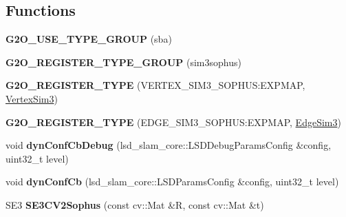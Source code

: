\subsection*{Functions}
\begin{DoxyCompactItemize}
\item 
\hypertarget{namespacelsd__slam_a3ba3963b636881bd28720c52808d52ce}{{\bfseries G2\-O\-\_\-\-U\-S\-E\-\_\-\-T\-Y\-P\-E\-\_\-\-G\-R\-O\-U\-P} (sba)}\label{namespacelsd__slam_a3ba3963b636881bd28720c52808d52ce}

\item 
\hypertarget{namespacelsd__slam_abd9538eb7de29ff8295b227fd54e4e87}{{\bfseries G2\-O\-\_\-\-R\-E\-G\-I\-S\-T\-E\-R\-\_\-\-T\-Y\-P\-E\-\_\-\-G\-R\-O\-U\-P} (sim3sophus)}\label{namespacelsd__slam_abd9538eb7de29ff8295b227fd54e4e87}

\item 
\hypertarget{namespacelsd__slam_a205cc9180f3d2b9b45b882dddcd40631}{{\bfseries G2\-O\-\_\-\-R\-E\-G\-I\-S\-T\-E\-R\-\_\-\-T\-Y\-P\-E} (V\-E\-R\-T\-E\-X\-\_\-\-S\-I\-M3\-\_\-\-S\-O\-P\-H\-U\-S\-:\-E\-X\-P\-M\-A\-P, \hyperlink{classlsd__slam_1_1_vertex_sim3}{Vertex\-Sim3})}\label{namespacelsd__slam_a205cc9180f3d2b9b45b882dddcd40631}

\item 
\hypertarget{namespacelsd__slam_a06e80794e500dc135bd4cba50e80565e}{{\bfseries G2\-O\-\_\-\-R\-E\-G\-I\-S\-T\-E\-R\-\_\-\-T\-Y\-P\-E} (E\-D\-G\-E\-\_\-\-S\-I\-M3\-\_\-\-S\-O\-P\-H\-U\-S\-:\-E\-X\-P\-M\-A\-P, \hyperlink{classlsd__slam_1_1_edge_sim3}{Edge\-Sim3})}\label{namespacelsd__slam_a06e80794e500dc135bd4cba50e80565e}

\item 
\hypertarget{namespacelsd__slam_a1727ed6a6a3b9b25505843d48cee74b5}{void {\bfseries dyn\-Conf\-Cb\-Debug} (lsd\-\_\-slam\-\_\-core\-::\-L\-S\-D\-Debug\-Params\-Config \&config, uint32\-\_\-t level)}\label{namespacelsd__slam_a1727ed6a6a3b9b25505843d48cee74b5}

\item 
\hypertarget{namespacelsd__slam_a0c6488bcb7e77ab97cae5c9db84ef819}{void {\bfseries dyn\-Conf\-Cb} (lsd\-\_\-slam\-\_\-core\-::\-L\-S\-D\-Params\-Config \&config, uint32\-\_\-t level)}\label{namespacelsd__slam_a0c6488bcb7e77ab97cae5c9db84ef819}

\item 
\hypertarget{namespacelsd__slam_a2b1864fb1c4a322800ac8449bafd4d32}{S\-E3 {\bfseries S\-E3\-C\-V2\-Sophus} (const cv\-::\-Mat \&R, const cv\-::\-Mat \&t)}\label{namespacelsd__slam_a2b1864fb1c4a322800ac8449bafd4d32}


\end{DoxyCompactItemize}
